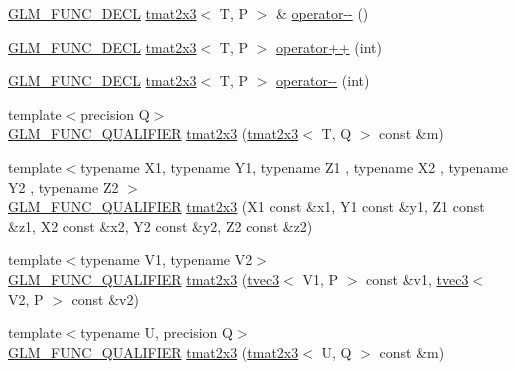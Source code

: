 \begin{DoxyCompactItemize}
\item 
\hyperlink{setup_8hpp_ab2d052de21a70539923e9bcbf6e83a51}{G\+L\+M\+\_\+\+F\+U\+N\+C\+\_\+\+D\+E\+CL} \hyperlink{structglm_1_1detail_1_1tmat2x3}{tmat2x3}$<$ T, P $>$ \& \hyperlink{structglm_1_1detail_1_1tmat2x3_a794f237071edb867947ac54de6fa9545}{operator-\/-\/} ()
\item 
\hyperlink{setup_8hpp_ab2d052de21a70539923e9bcbf6e83a51}{G\+L\+M\+\_\+\+F\+U\+N\+C\+\_\+\+D\+E\+CL} \hyperlink{structglm_1_1detail_1_1tmat2x3}{tmat2x3}$<$ T, P $>$ \hyperlink{structglm_1_1detail_1_1tmat2x3_a36ac4254a3ce5982afcf1330a675a973}{operator++} (int)
\item 
\hyperlink{setup_8hpp_ab2d052de21a70539923e9bcbf6e83a51}{G\+L\+M\+\_\+\+F\+U\+N\+C\+\_\+\+D\+E\+CL} \hyperlink{structglm_1_1detail_1_1tmat2x3}{tmat2x3}$<$ T, P $>$ \hyperlink{structglm_1_1detail_1_1tmat2x3_abbbbcd9db53e635fc2537666fe766b03}{operator-\/-\/} (int)
\item 
{\footnotesize template$<$precision Q$>$ }\\\hyperlink{setup_8hpp_a33fdea6f91c5f834105f7415e2a64407}{G\+L\+M\+\_\+\+F\+U\+N\+C\+\_\+\+Q\+U\+A\+L\+I\+F\+I\+ER} \hyperlink{structglm_1_1detail_1_1tmat2x3_ad87db0132efbb006cabcb3a833c516ba}{tmat2x3} (\hyperlink{structglm_1_1detail_1_1tmat2x3}{tmat2x3}$<$ T, Q $>$ const \&m)
\item 
{\footnotesize template$<$typename X1, typename Y1, typename Z1 , typename X2 , typename Y2 , typename Z2 $>$ }\\\hyperlink{setup_8hpp_a33fdea6f91c5f834105f7415e2a64407}{G\+L\+M\+\_\+\+F\+U\+N\+C\+\_\+\+Q\+U\+A\+L\+I\+F\+I\+ER} \hyperlink{structglm_1_1detail_1_1tmat2x3_a4314c8e147d0c2d536781f1743787ab0}{tmat2x3} (X1 const \&x1, Y1 const \&y1, Z1 const \&z1, X2 const \&x2, Y2 const \&y2, Z2 const \&z2)
\item 
{\footnotesize template$<$typename V1, typename V2$>$ }\\\hyperlink{setup_8hpp_a33fdea6f91c5f834105f7415e2a64407}{G\+L\+M\+\_\+\+F\+U\+N\+C\+\_\+\+Q\+U\+A\+L\+I\+F\+I\+ER} \hyperlink{structglm_1_1detail_1_1tmat2x3_a883732d6b9178b86a9e5d10483fb6b92}{tmat2x3} (\hyperlink{structglm_1_1detail_1_1tvec3}{tvec3}$<$ V1, P $>$ const \&v1, \hyperlink{structglm_1_1detail_1_1tvec3}{tvec3}$<$ V2, P $>$ const \&v2)
\item 
{\footnotesize template$<$typename U, precision Q$>$ }\\\hyperlink{setup_8hpp_a33fdea6f91c5f834105f7415e2a64407}{G\+L\+M\+\_\+\+F\+U\+N\+C\+\_\+\+Q\+U\+A\+L\+I\+F\+I\+ER} \hyperlink{structglm_1_1detail_1_1tmat2x3_a16af68f7f9699db992854c79210d8f32}{tmat2x3} (\hyperlink{structglm_1_1detail_1_1tmat2x3}{tmat2x3}$<$ U, Q $>$ const \&m)

\end{DoxyCompactItemize}
